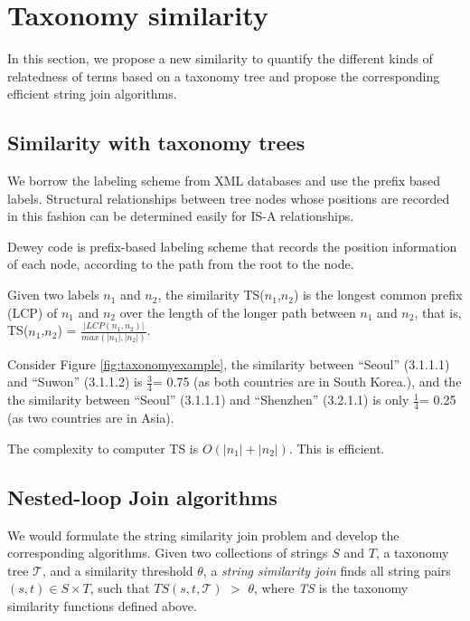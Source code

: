 \section{Taxonomy similarity}

In this section, we propose a new similarity to quantify the different kinds of relatedness of terms based on a taxonomy tree and propose the corresponding efficient string join algorithms.


\subsection{Similarity with taxonomy trees}


 We borrow the labeling scheme from XML databases and use the prefix based labels. Structural relationships between tree nodes whose positions
are recorded in this fashion can be determined easily for IS-A relationships.

\smallskip
\smallskip

Dewey code is prefix-based labeling scheme that records the position information of each node, according to the path from the root to the node. 

\begin{definition}
Given two labels $n_1$ and $n_2$,  the similarity TS($n_1$,$n_2$) is the longest common prefix (LCP) of  $n_1$ and $n_2$ over the length of the longer path between $n_1$ and $n_2$, that is,  TS($n_1$,$n_2$) = $\frac{|LCP(n_1,n_2)|}{max(|n_1|,|n_2|)}$. \end{definition}

\smallskip
\smallskip


\begin{example}
Consider Figure \ref{fig:taxonomyexample}, the similarity between ``\textsf{Seoul}'' (3.1.1.1) and ``\textsf{Suwon}'' (3.1.1.2) is $\frac{3}{4}$= 0.75 (as both countries are in South Korea.), and the the similarity between ``\textsf{Seoul}''  (3.1.1.1) and ``\textsf{Shenzhen}'' (3.2.1.1) is only $\frac{1}{4}$= 0.25 (as two countries are in Asia).
\end{example}

The complexity to computer TS is $O(|n_1|+|n_2|)$. This is efficient.


\subsection{ Nested-loop Join algorithms}


We would formulate the string similarity join problem and develop the corresponding algorithms. Given two collections of strings $S$ and $T$, a taxonomy tree
$\mathcal{T}$, and a similarity threshold $\theta$, a \textit{string
  similarity join} finds all string pairs $(s, t) \in S \times T$,
such that $TS(s,t,\mathcal{T})$ $>$ $\theta$, where \textit{TS} is
 the taxonomy similarity functions defined above.



